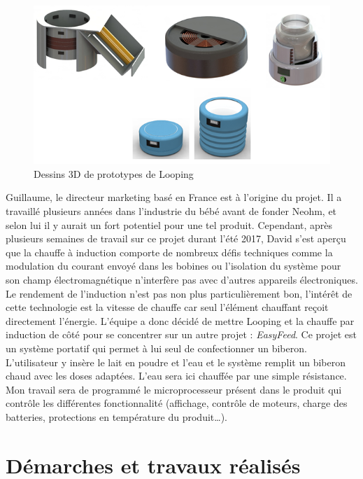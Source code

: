 \documentclass[a4paper, 11pt]{report}
\begin{document}
\begin{figure}[!h]
\begin{center}
\includegraphics[scale=0.75]{figures/screenshots/3D_drawing_looping.png}
\end{center}
\caption{Dessins 3D de prototypes de Looping}
\label{fig:3D_looping}
\end{figure}

Guillaume, le directeur marketing basé en France est à l’origine du projet. Il a travaillé plusieurs années dans l’industrie du bébé avant de fonder Neohm, et selon lui il y aurait un fort potentiel pour une tel produit.
Cependant, après plusieurs semaines de travail sur ce projet durant l’été 2017, David s’est aperçu que la chauffe à induction comporte de nombreux défis techniques comme la modulation du courant envoyé dans les bobines ou l’isolation du système pour son champ électromagnétique n’interfère pas avec d’autres appareils électroniques. Le rendement de l’induction n’est pas non plus particulièrement bon, l’intérêt de cette technologie est la vitesse de chauffe car seul l’élément chauffant reçoit directement l’énergie.
L’équipe a donc décidé de mettre Looping et la chauffe par induction de côté pour se concentrer sur un autre projet : \emph{EasyFeed}. Ce projet est un système portatif qui permet à lui seul de confectionner un biberon. L’utilisateur y insère le lait en poudre et l’eau et le système remplit un biberon chaud avec les doses adaptées. L’eau sera ici chauffée par une simple résistance.
Mon travail sera de programmé le microprocesseur présent dans le produit qui contrôle les différentes fonctionnalité (affichage, contrôle de moteurs, charge des batteries, protections en température du produit…).

\chapter{Démarches et travaux réalisés}
\end{document}
